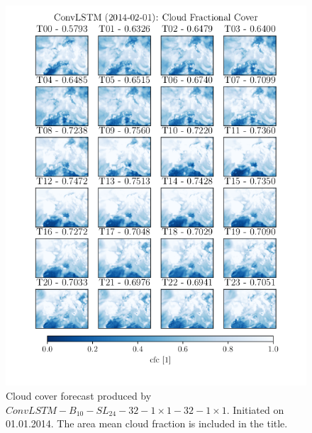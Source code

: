 \begin{figure}[ht]
    \centering
    \includegraphics{python_figs/timelapse_convlstm_1x1_24hrs_from_2014-02-01.png}
    \caption{Cloud cover forecast produced by $ConvLSTM-B_{10}-SL_{24}-32-1\times1-32-1\times1$. Initiated on 01.01.2014. The area mean cloud fraction is included in the title.}
    \label{fig:timelapse_1x1}
\end{figure}
\cleardoublepage

